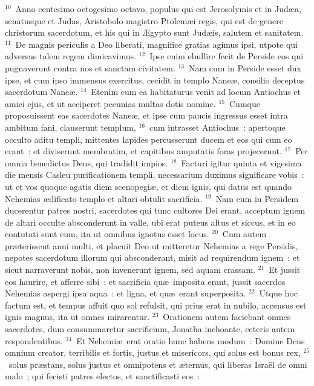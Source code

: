 ${}^{10}$~Anno centesimo octogesimo octavo, populus qui est Jerosolymis et in Jud\ae a, senatusque et Judas, Aristobolo magistro Ptolem\ae i regis, qui est de genere christorum sacerdotum, et his qui in \AE gypto sunt Jud\ae is, salutem et sanitatem.
${}^{11}$~De magnis periculis a Deo liberati, magnifice gratias agimus ipsi, utpote qui adversus talem regem dimicavimus.
${}^{12}$~Ipse enim ebullire fecit de Perside eos qui pugnaverunt contra nos et sanctam civitatem.
${}^{13}$~Nam cum in Perside esset dux ipse, et cum ipso immensus exercitus, cecidit in templo Nane\ae , consilio deceptus sacerdotum Nane\ae .
${}^{14}$~Etenim cum ea habitaturus venit ad locum Antiochus et amici ejus, et ut acciperet pecunias multas dotis nomine.
${}^{15}$~Cumque proposuissent eas sacerdotes Nane\ae , et ipse cum paucis ingressus esset intra ambitum fani, clauserunt templum,
${}^{16}$~cum intrasset Antiochus~: apertoque occulto aditu templi, mittentes lapides percusserunt ducem et eos qui cum eo erant~: et diviserunt membratim, et capitibus amputatis foras projecerunt.
${}^{17}$~Per omnia benedictus Deus, qui tradidit impios.
${}^{18}$~Facturi igitur quinta et vigesima die mensis Casleu purificationem templi, necessarium duximus significare vobis~: ut et vos quoque agatis diem scenopegi\ae , et diem ignis, qui datus est quando Nehemias \ae dificato templo et altari obtulit sacrificia.
${}^{19}$~Nam cum in Persidem ducerentur patres nostri, sacerdotes qui tunc cultores Dei erant, acceptum ignem de altari occulte absconderunt in valle, ubi erat puteus altus et siccus, et in eo contutati sunt eum, ita ut omnibus ignotus esset locus.
${}^{20}$~Cum autem pr\ae terissent anni multi, et placuit Deo ut mitteretur Nehemias a rege Persidis, nepotes sacerdotum illorum qui absconderant, misit ad requirendum ignem~: et sicut narraverunt nobis, non invenerunt ignem, sed aquam crassam.
${}^{21}$~Et jussit eos haurire, et afferre sibi~: et sacrificia qu\ae\ imposita erant, jussit sacerdos Nehemias aspergi ipsa aqua~: et ligna, et qu\ae\ erant superposita.
${}^{22}$~Utque hoc factum est, et tempus affuit quo sol refulsit, qui prius erat in nubilo, accensus est ignis magnus, ita ut omnes mirarentur.
${}^{23}$~Orationem autem faciebant omnes sacerdotes, dum consummaretur sacrificium, Jonatha inchoante, ceteris autem respondentibus.
${}^{24}$~Et Nehemi\ae\ erat oratio hunc habens modum~: Domine Deus omnium creator, terribilis et fortis, justus et misericors, qui solus est bonus rex,
${}^{25}$~solus pr\ae stans, solus justus et omnipotens et \ae ternus, qui liberas Isra\"el de omni malo~; qui fecisti patres electos, et sanctificasti eos~:
